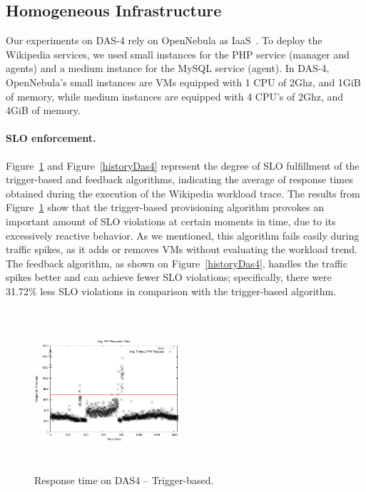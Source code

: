 
\subsection*{Homogeneous Infrastructure}

Our experiments on DAS-4 rely on OpenNebula as IaaS~\cite{sotomayor_virtual_2009}. To deploy the Wikipedia services, we used small instances for the PHP service (manager and agents) and a medium instance for the MySQL service (agent). In DAS-4, OpenNebula's small instances are VMs equipped with 1 CPU of 2Ghz, and 1GiB of memory, while medium instances are equipped with 4 CPU's of 2Ghz, and 4GiB of memory.

\paragraph{SLO enforcement.}
Figure~\ref{naiveDas4} and Figure~\ref{historyDas4} represent the degree of SLO fulfillment of the trigger-based and feedback algorithms, indicating the average of response times obtained during the execution of the Wikipedia workload trace. The results from Figure~\ref{naiveDas4} show that the trigger-based provisioning algorithm provokes an important amount of SLO violations at certain moments in time, due to its excessively reactive behavior. As we mentioned, this algorithm fails easily during traffic spikes, as it adds or removes VMs without evaluating the workload trend. The feedback algorithm, as shown on Figure~\ref{historyDas4}, handles the traffic spikes better and can achieve fewer SLO violations; specifically, there were 31.72\% less SLO violations in comparison with the trigger-based algorithm. 


\begin{figure}

\begin{center}
\includegraphics[width=0.49\textwidth, height=6cm]{./images/homogeneous/avgTimeout_PhP_trigger}
\end{center}
\vspace{-5mm}
\caption{Response time on DAS4 -- Trigger-based.}
\label{naiveDas4}
\end{figure}

